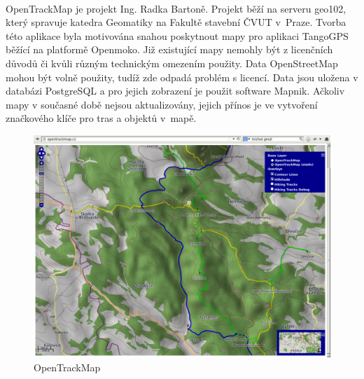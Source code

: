 \documentclass[11pt,a4paper,titlepage,oneside]{book}
\begin{document}
                

		\paragraph{} OpenTrackMap je projekt Ing. Radka Bartoně. Projekt běží na serveru geo102, který spravuje katedra Geomatiky na Fakultě stavební ČVUT v~Praze. Tvorba této aplikace byla motivována snahou poskytnout mapy pro aplikaci TangoGPS běžící na platformě Openmoko\cite{OTM}. Již existující mapy nemohly být z licenčních důvodů či kvůli různým technickým omezením použity. Data OpenStreetMap mohou být volně použity, tudíž zde odpadá problém s licencí. Data jsou uložena v databázi PostgreSQL a pro jejich zobrazení je použit software Mapnik. Ačkoliv mapy v současné době nejsou aktualizovány, jejich přínos je ve vytvoření značkového klíče pro tras a objektů v~mapě. 

		\begin{figure}[!h]
			\begin{center}
				\includegraphics[width=12cm]{obrazky/otm.png}
				\caption{OpenTrackMap}
			\end{center}
		\end{figure}

\end{document}
